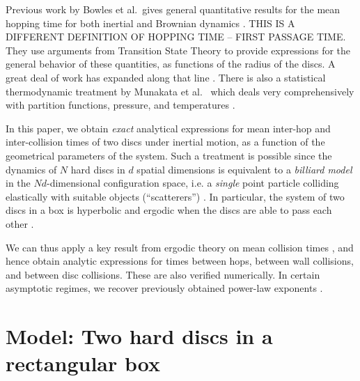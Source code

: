 \documentclass[superscriptaddress,pre,reprint,showpacs,onecolumn]{revtex4-1}
\newcommand{\etal}{et al.\ }
\begin{document}
Previous work
by Bowles \etal gives general quantitative results for the mean hopping 
time for both inertial and Brownian dynamics \cite{Bowles04}. THIS IS A DIFFERENT DEFINITION OF HOPPING TIME -- FIRST PASSAGE TIME.
They use arguments from Transition State Theory 
to provide expressions for the general behavior of these quantities, as functions of the
radius of the discs. %
A great deal of work has expanded along that line  \cite{Suh05, Ball09}.
There is also a statistical thermodynamic treatment by Munakata \etal 
which deals very comprehensively with partition functions, pressure,
and temperatures \cite{Munakata02, Munakata06}. 


In this paper, we obtain \emph{exact} analytical expressions for mean inter-hop and inter-collision times of two discs under 
inertial motion, as a function of the geometrical parameters of the system. Such a treatment is possible
 since the dynamics of $N$ hard discs in $d$ spatial dimensions
 is equivalent to a \emph{billiard model} in the $Nd$-dimensional configuration space, i.e. a \emph{single} point particle colliding elastically 
with suitable objects (``scatterers'') \cite{SzaszBook00}. 
In particular, the system of two discs in a box is hyperbolic and ergodic when the discs are able to pass each other \cite{Sim99}. 

We can thus apply a key result from ergodic theory on mean collision times \cite{Chernov97}, and hence obtain analytic expressions 
for times between hops, between wall collisions, and between disc collisions. These are also verified numerically. 
In certain asymptotic regimes, we recover previously obtained power-law exponents \cite{Bowles04}.





\section{Model: Two hard discs in a rectangular box}
\end{document}
